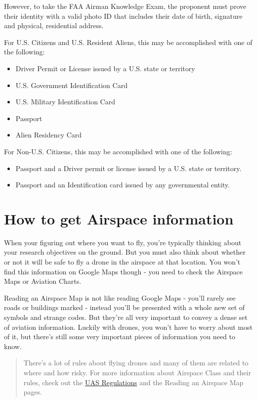 \documentclass[
]{book}
\providecommand{\tightlist}{%
  \setlength{\itemsep}{0pt}\setlength{\parskip}{0pt}}
\begin{document}
However, to take the FAA Airman Knowledge Exam, the proponent must prove their identity with a valid photo ID that includes their date of birth, signature and physical, residential address.

For U.S. Citizens and U.S. Resident Aliens, this may be accomplished with one of the following:

\begin{itemize}
\tightlist
\item
  Driver Permit or License issued by a U.S. state or territory
\item
  U.S. Government Identification Card
\item
  U.S. Military Identification Card
\item
  Passport
\item
  Alien Residency Card
\end{itemize}

For Non-U.S. Citizens, this may be accomplished with one of the following:

\begin{itemize}
\tightlist
\item
  Passport and a Driver permit or license issued by a U.S. state or territory.
\item
  Passport and an Identification card issued by any governmental entity.
\end{itemize}

\hypertarget{ch-airspace-info}{%
\chapter{How to get Airspace information}\label{ch-airspace-info}}

When your figuring out where you want to fly, you're typically thinking about your research objectives on the ground. But you must also think about whether or not it will be safe to fly a drone in the airspace at that location. You won't find this information on Google Maps though - you need to check the Airspace Maps or Aviation Charts.

Reading an Airspace Map is not like reading Google Maps - you'll rarely see roads or buildings marked - instead you'll be presented with a whole new set of symbols and strange codes. But they're all very important to convey a dense set of aviation information. Luckily with drones, you won't have to worry about most of it, but there's still some very important pieces of information you need to know.

\begin{quote}
There's a lot of rules about flying drones and many of them are related to where and how risky. For more information about Airspace Class and their rules, check out the \protect\hyperlink{ch-regulations}{UAS Regulations} and the Reading an Airspace Map pages.
\end{quote}
\end{document}
